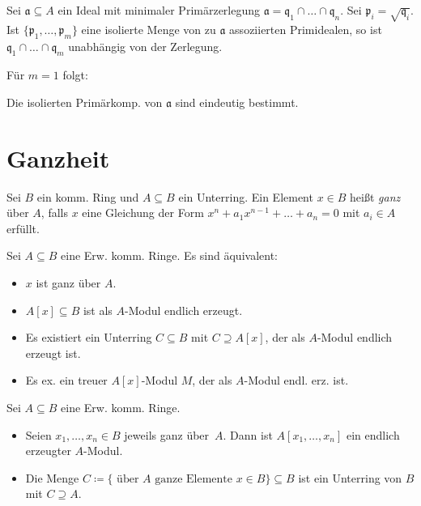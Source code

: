 \documentclass{cheat-sheet}
\newcommand{\aaa}{\mathfrak{a}}
\newcommand{\ppp}{\mathfrak{p}}
\newcommand{\qqq}{\mathfrak{q}}
\begin{document}
\begin{satz}
  Sei $\aaa \subseteq A$ ein Ideal mit minimaler Primärzerlegung $\aaa = \qqq_1 \cap \ldots \cap \qqq_n$.
  Sei $\ppp_i = \sqrt{\qqq_i}$.
  Ist $\{ \ppp_1, \ldots, \ppp_m \}$ eine isolierte Menge von zu $\aaa$ assoziierten Primidealen, so ist $\qqq_1 \cap \ldots \cap \qqq_m$ unabhängig von der Zerlegung.
\end{satz}

Für $m=1$ folgt:

\begin{kor}
  Die isolierten Primärkomp. von $\aaa$ sind eindeutig bestimmt.
\end{kor}

\section{Ganzheit}



\begin{defn}
  Sei $B$ ein komm. Ring und $A \subseteq B$ ein Unterring.
  Ein Element $x \in B$ heißt \emph{ganz} über $A$, falls $x$ eine Gleichung der Form $x^n + a_1 x^{n-1} + \ldots + a_n = 0$ mit $a_i \in A$ erfüllt.
\end{defn}

\begin{prop}
  Sei $A \subseteq B$ eine Erw. komm. Ringe.
  Es sind äquivalent:
  \begin{itemize}
    \item $x$ ist ganz über $A$.
    \item $A[x] \subseteq B$ ist als $A$-Modul endlich erzeugt.
    \item Es existiert ein Unterring $C \subseteq B$ mit $C \supseteq A[x]$, der als $A$-Modul endlich erzeugt ist.
    \item Es ex. ein treuer $A[x]$-Modul $M$, der als $A$-Modul endl. erz. ist.
  \end{itemize}
\end{prop}

\begin{kor}
  Sei $A \subseteq B$ eine Erw. komm. Ringe.
  \begin{itemize}
    \item Seien $x_1, \ldots, x_n \in B$ jeweils ganz über~$A$.
    Dann ist $A[x_1, \ldots, x_n]$ ein endlich erzeugter $A$-Modul.
    \item Die Menge $C \coloneqq \{ \text{ über $A$ ganze Elemente $x \in B$} \} \subseteq B$ ist ein Unterring von $B$ mit $C \supseteq A$.
  \end{itemize}
\end{kor}
\end{document}
